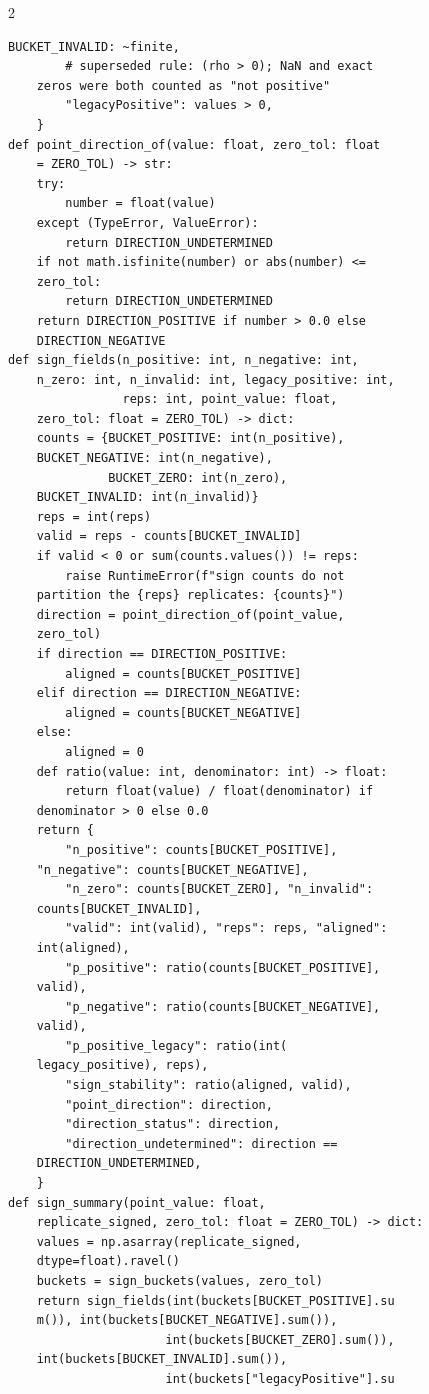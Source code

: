 \begin{multicols}{2}
\begin{Verbatim}[fontsize=\scriptsize]
        BUCKET_INVALID: ~finite,
        # superseded rule: (rho > 0); NaN and exact
    zeros were both counted as "not positive"
        "legacyPositive": values > 0,
    }
def point_direction_of(value: float, zero_tol: float
    = ZERO_TOL) -> str:
    try:
        number = float(value)
    except (TypeError, ValueError):
        return DIRECTION_UNDETERMINED
    if not math.isfinite(number) or abs(number) <=
    zero_tol:
        return DIRECTION_UNDETERMINED
    return DIRECTION_POSITIVE if number > 0.0 else
    DIRECTION_NEGATIVE
def sign_fields(n_positive: int, n_negative: int,
    n_zero: int, n_invalid: int, legacy_positive: int,
                reps: int, point_value: float,
    zero_tol: float = ZERO_TOL) -> dict:
    counts = {BUCKET_POSITIVE: int(n_positive),
    BUCKET_NEGATIVE: int(n_negative),
              BUCKET_ZERO: int(n_zero),
    BUCKET_INVALID: int(n_invalid)}
    reps = int(reps)
    valid = reps - counts[BUCKET_INVALID]
    if valid < 0 or sum(counts.values()) != reps:
        raise RuntimeError(f"sign counts do not
    partition the {reps} replicates: {counts}")
    direction = point_direction_of(point_value,
    zero_tol)
    if direction == DIRECTION_POSITIVE:
        aligned = counts[BUCKET_POSITIVE]
    elif direction == DIRECTION_NEGATIVE:
        aligned = counts[BUCKET_NEGATIVE]
    else:
        aligned = 0
    def ratio(value: int, denominator: int) -> float:
        return float(value) / float(denominator) if
    denominator > 0 else 0.0
    return {
        "n_positive": counts[BUCKET_POSITIVE],
    "n_negative": counts[BUCKET_NEGATIVE],
        "n_zero": counts[BUCKET_ZERO], "n_invalid":
    counts[BUCKET_INVALID],
        "valid": int(valid), "reps": reps, "aligned":
    int(aligned),
        "p_positive": ratio(counts[BUCKET_POSITIVE],
    valid),
        "p_negative": ratio(counts[BUCKET_NEGATIVE],
    valid),
        "p_positive_legacy": ratio(int(
    legacy_positive), reps),
        "sign_stability": ratio(aligned, valid),
        "point_direction": direction,
        "direction_status": direction,
        "direction_undetermined": direction ==
    DIRECTION_UNDETERMINED,
    }
def sign_summary(point_value: float,
    replicate_signed, zero_tol: float = ZERO_TOL) -> dict:
    values = np.asarray(replicate_signed,
    dtype=float).ravel()
    buckets = sign_buckets(values, zero_tol)
    return sign_fields(int(buckets[BUCKET_POSITIVE].su
    m()), int(buckets[BUCKET_NEGATIVE].sum()),
                      int(buckets[BUCKET_ZERO].sum()),
    int(buckets[BUCKET_INVALID].sum()),
                      int(buckets["legacyPositive"].su

\end{Verbatim}
\end{multicols}
